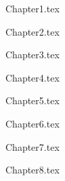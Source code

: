 \documentclass[a4paper, 11pt, oneside]{Thesis}  %
\begin{document}

\pagestyle{empty}  %



\mainmatter	  %
\pagestyle{fancy}  %


{Chapter1.tex} %

{Chapter2.tex} %

{Chapter3.tex} %

{Chapter4.tex} %

{Chapter5.tex} %

{Chapter6.tex} %

{Chapter7.tex} %

{Chapter8.tex} %



\appendix %




\backmatter

\label{Bibliography}
\end{document}
